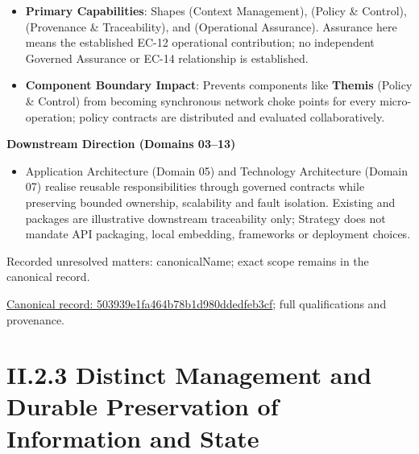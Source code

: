 \begin{itemize}


\item \textbf{Primary Capabilities}: Shapes \texttt{} (Context Management), \texttt{} (Policy \& Control), \texttt{} (Provenance \& Traceability), and \texttt{} (Operational Assurance). Assurance here means the established EC-12 operational contribution; no independent Governed Assurance or EC-14 relationship is established.

\item \textbf{Component Boundary Impact}: Prevents components like \textbf{Themis} (Policy \& Control) from becoming synchronous network choke points for every micro-operation; policy contracts are distributed and evaluated collaboratively.

\end{itemize}


\par\medskip\textbf{Downstream Direction (Domains 03–13)}\par


\begin{itemize}


\item Application Architecture (Domain 05) and Technology Architecture (Domain 07) realise reusable responsibilities through governed contracts while preserving bounded ownership, scalability and fault isolation. Existing \texttt{} and \texttt{} packages are illustrative downstream traceability only; Strategy does not mandate API packaging, local embedding, frameworks or deployment choices.

\end{itemize}

{\small Recorded unresolved matters: canonicalName; exact scope remains in the canonical record.}\par
{\footnotesize \href{../../../../../../../continuum/strategy/course-of-action/503939e1fa464b78b1d980ddedfeb3cf.md}{Canonical record: 503939e1fa464b78b1d980ddedfeb3cf}; full qualifications and provenance.}\par
\section*{II.2.3 Distinct Management and Durable Preservation of Information and State}
\label{navigation:II.2.3}


